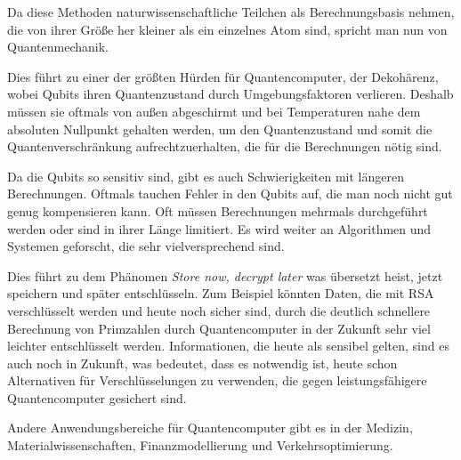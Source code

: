 Da diese Methoden naturwissenschaftliche Teilchen als Berechnungsbasis nehmen, die von ihrer Größe her kleiner als ein einzelnes Atom sind, spricht man nun von Quantenmechanik. 

Dies führt zu einer der größten Hürden für Quantencomputer, der Dekohärenz, wobei Qubits ihren Quantenzustand durch Umgebungsfaktoren verlieren. Deshalb müssen sie oftmals von außen abgeschirmt und bei Temperaturen nahe dem absoluten Nullpunkt gehalten werden, um den Quantenzustand und somit die Quantenverschränkung aufrechtzuerhalten, die für die Berechnungen nötig sind.

Da die Qubits so sensitiv sind, gibt es auch Schwierigkeiten mit längeren Berechnungen. Oftmals tauchen Fehler in den Qubits auf, die man noch nicht gut genug kompensieren kann. Oft müssen Berechnungen mehrmals durchgeführt werden oder sind in ihrer Länge limitiert.\cite{brubaker_quantum_2024} Es wird weiter an Algorithmen und Systemen geforscht, die sehr vielversprechend sind.

Dies führt zu dem Phänomen  \textit{Store now, decrypt later} was übersetzt heist, jetzt speichern und später entschlüsseln. Zum Beispiel könnten Daten, die mit RSA verschlüsselt werden und heute noch sicher sind, durch die deutlich schnellere Berechnung von Primzahlen durch Quantencomputer in der Zukunft sehr viel leichter entschlüsselt werden. 
Informationen, die heute als sensibel gelten, sind es auch noch in Zukunft, was bedeutet, dass es notwendig ist, heute schon Alternativen für Verschlüsselungen zu verwenden, die gegen leistungsfähigere Quantencomputer gesichert sind.\cite{veritasium_how_2023}

Andere Anwendungsbereiche für Quantencomputer gibt es in der Medizin, 
Materialwissenschaften, Finanzmodellierung 
und Verkehrsoptimierung. \cite{Applications_10_nodate}